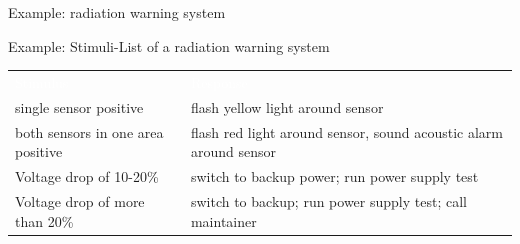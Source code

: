 \documentclass[ngerman={babel}, utf8, bigger, xcolor={table,dvipsnames}, ompress, hyperref={bookmarks,colorlinks}]{beamer}
\begin{document}
\begin{frame}{Example: radiation warning system}
	
\end{frame}

\begin{frame}{Example: Stimuli-List of a radiation warning system}
	\begin{tabular}{p{9em}p{13em}}
		\rowcolor{blue}\hline \textcolor{white}{Stimulus} & \textcolor{white}{Response} \pause \\
		single sensor positive & flash yellow light around sensor \pause \\
		both sensors in one area positive & flash red light around sensor, sound acoustic alarm around sensor \pause \\
		Voltage drop of 10-20\% & switch to backup power; run power supply test \pause \\
		Voltage drop of more than 20\% & switch to backup; run power supply test; call maintainer \\
	\end{tabular}
\end{frame}
\end{document}
